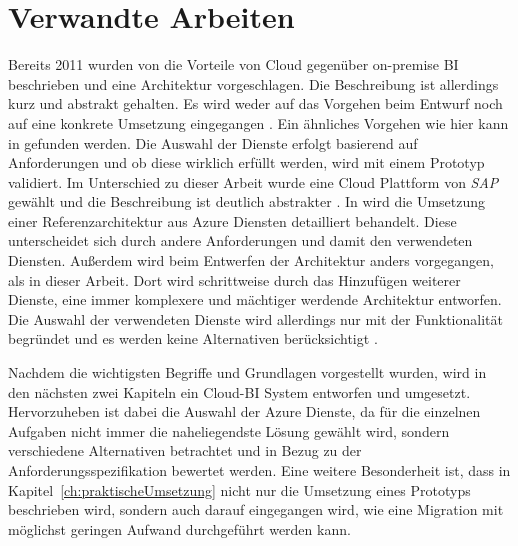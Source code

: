 \section{Verwandte Arbeiten} \label{ch:verwandteArbeiten}
Bereits 2011 wurden von \citeauthor{ouf_cloud_2011} die Vorteile von Cloud gegenüber on-premise BI beschrieben und eine Architektur vorgeschlagen. Die Beschreibung ist allerdings kurz und abstrakt gehalten. Es wird weder auf das Vorgehen beim Entwurf noch auf eine konkrete Umsetzung eingegangen \cite[vgl.][]{ouf_cloud_2011}. Ein ähnliches Vorgehen wie hier kann in  gefunden werden. Die Auswahl der Dienste erfolgt basierend auf Anforderungen und ob diese wirklich erfüllt werden, wird mit einem Prototyp validiert. Im Unterschied zu dieser Arbeit wurde eine Cloud Plattform von \textit{SAP} gewählt und die Beschreibung ist deutlich abstrakter \cite[vgl.][]{oliver_norkus_rabic_2016}. In  wird die Umsetzung einer Referenzarchitektur aus Azure Diensten detailliert behandelt. Diese unterscheidet sich durch andere Anforderungen und damit den verwendeten Diensten. Außerdem wird beim Entwerfen der Architektur anders vorgegangen, als in dieser Arbeit. Dort wird schrittweise durch das Hinzufügen weiterer Dienste, eine immer komplexere und mächtiger werdende Architektur entworfen. Die Auswahl der verwendeten Dienste wird allerdings nur mit der Funktionalität begründet und es werden keine Alternativen berücksichtigt \cite[vgl.][]{borosch_cloud_2021}.

Nachdem die wichtigsten Begriffe und Grundlagen vorgestellt wurden, wird in den nächsten zwei Kapiteln ein Cloud-BI System entworfen und umgesetzt. Hervorzuheben ist dabei die Auswahl der Azure Dienste, da für die einzelnen Aufgaben nicht immer die naheliegendste Lösung gewählt wird, sondern verschiedene Alternativen betrachtet und in Bezug zu der Anforderungsspezifikation bewertet werden. Eine weitere Besonderheit ist, dass in Kapitel~\ref{ch:praktischeUmsetzung} nicht nur die Umsetzung eines Prototyps beschrieben wird, sondern auch darauf eingegangen wird, wie eine Migration mit möglichst geringen Aufwand durchgeführt werden kann.